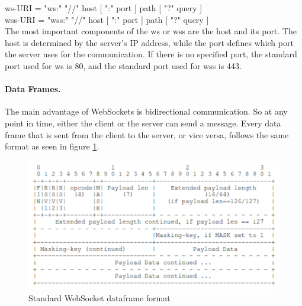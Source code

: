 \documentclass[a4paper, 11pt]{report}
\begin{document}
\indent	ws-URI  = "ws:" "//" host [ ":" port ] path [ "?" query ]\\
\indent	wss-URI = "wss:" "//" host [ ":" port ] path [ "?" query ]\\

The most important components of the ws or wss are the host and its port. The host is determined by the server's IP address, while the port defines which port the server uses for the communication. If there is no specified port, the standard port used for ws is 80, and the standard port used for wss is 443.
		
		\paragraph{Data Frames.}
The main advantage of WebSockets is bidirectional communication. So at any point in time, either the client or the server can send a message. Every data frame that is sent from the client to the server, or vice versa, follows the same format as seen in figure \ref{fig:dataFrame}.

	\begin{figure}[ht]
		\centering
		\includegraphics[scale=0.5]{images/WebSocketDataFrame.pdf}
		\caption{Standard WebSocket dataframe format}\label{fig:dataFrame}
	\end{figure}
\end{document}
